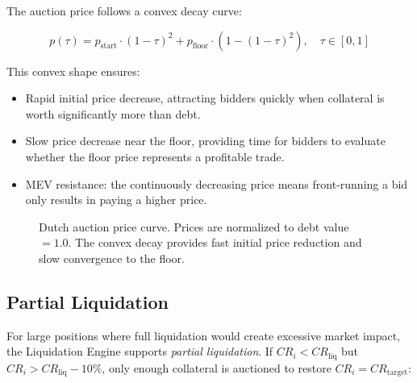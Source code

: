 \documentclass[11pt,a4paper]{article}
\newcommand{\CR}{\mathit{CR}}
\begin{document}
The auction price follows a convex decay curve:

\begin{equation}
  p(\tau) = p_{\text{start}} \cdot (1 - \tau)^2 + p_{\text{floor}} \cdot \left(1 - (1 - \tau)^2\right), \quad \tau \in [0, 1]
\end{equation}

This convex shape ensures:
\begin{itemize}
  \item Rapid initial price decrease, attracting bidders quickly when collateral is worth significantly more than debt.
  \item Slow price decrease near the floor, providing time for bidders to evaluate whether the floor price represents a profitable trade.
  \item MEV resistance: the continuously decreasing price means front-running a bid only results in paying a higher price.
\end{itemize}

\begin{figure}[H]
\centering
{}
\caption{Dutch auction price curve. Prices are normalized to debt value $= 1.0$. The convex decay provides fast initial price reduction and slow convergence to the floor.}
\label{fig:auction}
\end{figure}

\subsection{Partial Liquidation}

For large positions where full liquidation would create excessive market impact, the Liquidation Engine supports \emph{partial liquidation}.
If $\CR_i < \CR_{\text{liq}}$ but $\CR_i > \CR_{\text{liq}} - 10\%$, only enough collateral is auctioned to restore $\CR_i = \CR_{\text{target}}$:
\end{document}
